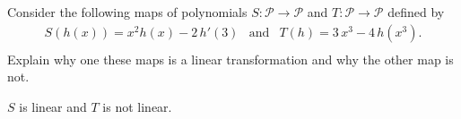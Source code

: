 
\begin{exerciseStatement}


Consider the following maps of polynomials \(S:\mathcal{P}\rightarrow\mathcal{P}\) and \(T:\mathcal{P}\rightarrow\mathcal{P}\) defined by 
\begin{align*} S(h(x))= x^{2} h\left(x\right) - 2 \, h'\left(3\right)  & \text{and} & T(h)= 3 \, x^{3} - 4 \, h\left(x^{3}\right) . \\ \end{align*}
             Explain why one these maps is a linear transformation and why the other map is not. 


\end{exerciseStatement}
    
\begin{exerciseAnswer} 


\(S\) is linear and \(T\) is not linear.


\end{exerciseAnswer}
    
